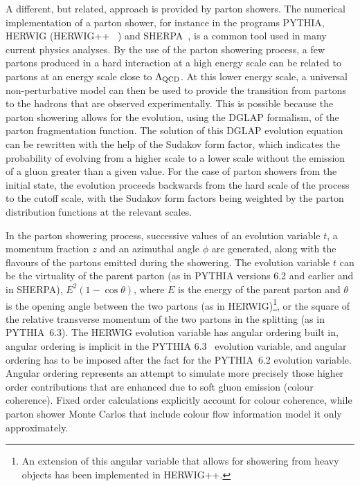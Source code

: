 \documentclass[12pt]{iopart}
\begin{document}
A different, but related, approach is provided by parton showers. The numerical implementation of a
parton shower, for instance in the programs PYTHIA,  HERWIG (HERWIG++~ \cite{Gieseke:2006ga}) and
SHERPA~\cite{Gleisberg:2003xi}, is a common tool used in many current
physics analyses.  By the use of the parton showering process, a few partons produced in a hard
interaction at  a high energy scale can be related  to partons at  an energy scale close to
$\Lambda_{\rm QCD}$.  At this lower energy scale, a universal non-perturbative model can then be used to
provide  the transition from partons to the hadrons that are observed experimentally. This is
possible  because the parton showering allows for the evolution, using the DGLAP formalism, of the
parton fragmentation function. The solution of this DGLAP evolution equation can be rewritten with
the help of the Sudakov form factor, which indicates the probability of evolving from a higher
scale to a lower scale
without the emission of a gluon greater than a given value. For the case of parton showers from the
initial state, the evolution proceeds backwards from the hard scale of the process to the cutoff
scale, with the Sudakov form factors being weighted by the parton distribution functions at the
relevant scales.

In the parton showering process, successive values of an evolution variable $t$, a momentum fraction
$z$ and an azimuthal angle $\phi$ are generated, along with the flavours of the partons emitted during
the showering. The evolution variable $t$ can be the virtuality of the parent parton (as in PYTHIA
versions 6.2 and earlier and in SHERPA), $E^2(1-\cos\theta)$, where $E$ is the energy of the parent parton and
$\theta$ is the opening angle between the two partons
(as in HERWIG)\footnote{An extension of this angular variable that allows for showering from heavy
objects has been implemented in HERWIG++.}, or the square of the relative
transverse momentum of the two partons in the splitting (as in PYTHIA~6.3). The HERWIG evolution
variable has angular ordering built in, angular ordering is implicit in the PYTHIA
6.3~\cite{Sjostrand:2004ef} evolution variable, and angular ordering has to be imposed after the fact
for the PYTHIA~6.2 evolution variable.  Angular ordering represents an attempt to simulate more
precisely those higher order contributions that are enhanced due to soft gluon emission (colour coherence).
Fixed order calculations explicitly account for colour coherence, while parton shower Monte Carlos
that include colour flow information model it only approximately.  
\end{document}
